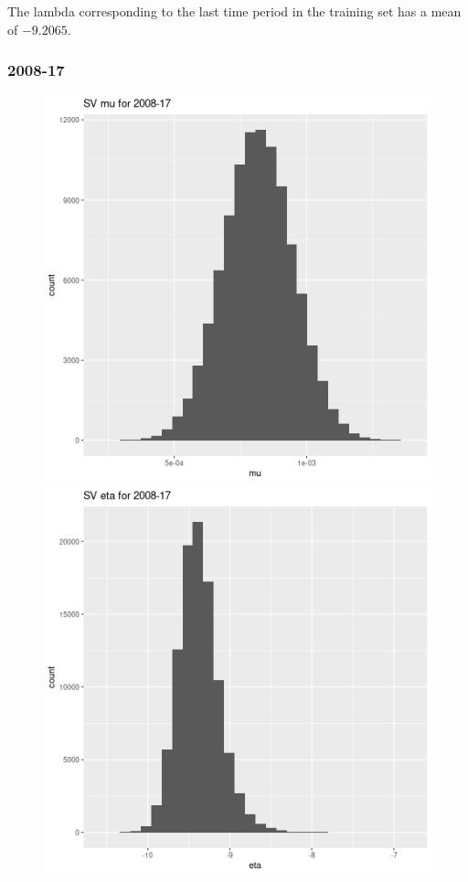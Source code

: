 \documentclass[12pt,letterpaper,reqno,fleqn]{article}
\begin{document}
The lambda corresponding to the last time period in the training set has a mean of $-9.2065$.

\subsubsection{2008-17}
\begin{figure}
\includegraphics[scale = .4]{svmu0817}
\includegraphics[scale = .4]{sve0817}

\end{figure}
\end{document}
